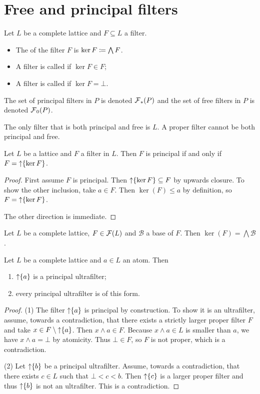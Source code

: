 \section{Free and principal filters}
\begin{definition}
Let $L$ be a complete lattice and $F\subseteq L$ a filter.
\begin{itemize}
\item The  of the filter $F$ is $\ker F \coloneqq \bigwedge F$.
\item A filter is called  if $\ker F \in F$;
\item A filter is called  if $\ker F = \bot$.
\end{itemize}
The set of principal filters in $P$ is denoted $\operatorname{\mathcal{F}}_*(P)$ and the set of free filters in $P$ is denoted $\operatorname{\mathcal{F}}_0(P)$.
\end{definition}
The only filter that is both principal and free is $L$. A proper filter cannot be both principal and free.

\begin{lemma}
Let $L$ be a lattice and $F$ a filter in $L$. Then $F$ is principal \textup{if and only if} $F = \operatorname{\uparrow} \{\ker F\}$.
\end{lemma}
\begin{proof}
First assume $F$ is principal. Then $\operatorname{\uparrow} \{\ker F\}\subseteq F$ by upwards closure. To show the other inclusion, take $a\in F$. Then $\ker(F)\leq a$ by definition, so $F = \operatorname{\uparrow} \{\ker F\}$.

The other direction is immediate.
\end{proof}

\begin{lemma} \label{kernelFilterBase}
Let $L$ be a complete lattice, $F\in\operatorname{\mathcal{F}}(L)$ and $\mathcal{B}$ a base of $F$. Then $\ker(F) = \bigwedge \mathcal{B}$.
\end{lemma}

\begin{proposition} \label{principalUltrafilters}
Let $L$ be a complete lattice and $a\in L$ an atom. Then
\begin{enumerate}
\item $\operatorname{\uparrow}\{a\}$ is a principal ultrafilter;
\item every principal ultrafilter is of this form.
\end{enumerate}
\end{proposition}
\begin{proof}
(1) The filter $\operatorname{\uparrow}\{a\}$ is principal by construction. To show it is an ultrafilter, assume, towards a contradiction, that there exists a strictly larger proper filter $F$ and take $x\in F\setminus \operatorname{\uparrow}\{a\}$. Then $x\wedge a\in F$. Because $x\wedge a \in L$ is smaller than $a$, we have $x\wedge a = \bot$ by atomicity. Thus $\bot \in F$, so $F$ is not proper, which is a contradiction.

(2) Let $\operatorname{\uparrow}\{b\}$ be a principal ultrafilter. Assume, towards a contradiction, that there exists $c\in L$ such that $\bot < c < b$. Then $\operatorname{\uparrow}\{c\}$ is a larger proper filter and thus $\operatorname{\uparrow}\{b\}$ is not an ultrafilter. This is a contradiction.
\end{proof}

